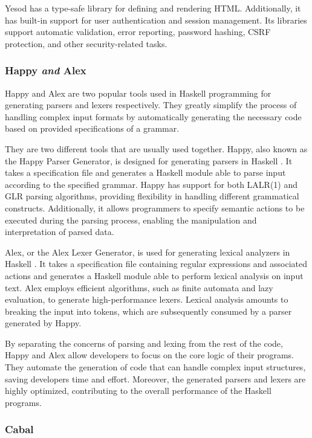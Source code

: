 \documentclass[a4paper, titlepage, twoside]{article}
\begin{document}
Yesod has a type-safe library for defining and rendering HTML. Additionally, it has built-in support for user authentication and session management. Its libraries support automatic validation, error reporting, password hashing, CSRF protection, and other security-related tasks.

\subsubsection{Happy \emph{and} Alex}
\label{sec:orgc3eac9e}

Happy and Alex are two popular tools used in Haskell programming for generating parsers and lexers respectively. They greatly simplify the process of handling complex input formats by automatically generating the necessary code based on provided specifications of a grammar.

They are two different tools that are usually used together. Happy, also known as the Happy Parser Generator, is designed for generating parsers in Haskell \autocite{Happy2023}. It takes a specification file and generates a Haskell module able to parse input according to the specified grammar. Happy has support for both LALR(1) and GLR parsing algorithms, providing flexibility in handling different grammatical constructs. Additionally, it allows programmers to specify semantic actions to be executed during the parsing process, enabling the manipulation and interpretation of parsed data.

Alex, or the Alex Lexer Generator, is used for generating lexical analyzers in Haskell \autocite{AlexLexicalAnalyser2023}. It takes a specification file containing regular expressions and associated actions and generates a Haskell module able to perform lexical analysis on input text. Alex employs efficient algorithms, such as finite automata and lazy evaluation, to generate high-performance lexers. Lexical analysis amounts to breaking the input into tokens, which are subsequently consumed by a parser generated by Happy.

By separating the concerns of parsing and lexing from the rest of the code, Happy and Alex allow developers to focus on the core logic of their programs. They automate the generation of code that can handle complex input structures, saving developers time and effort. Moreover, the generated parsers and lexers are highly optimized, contributing to the overall performance of the Haskell programs.

\subsubsection{Cabal}
\label{sec:org2ce96ed}
\end{document}
